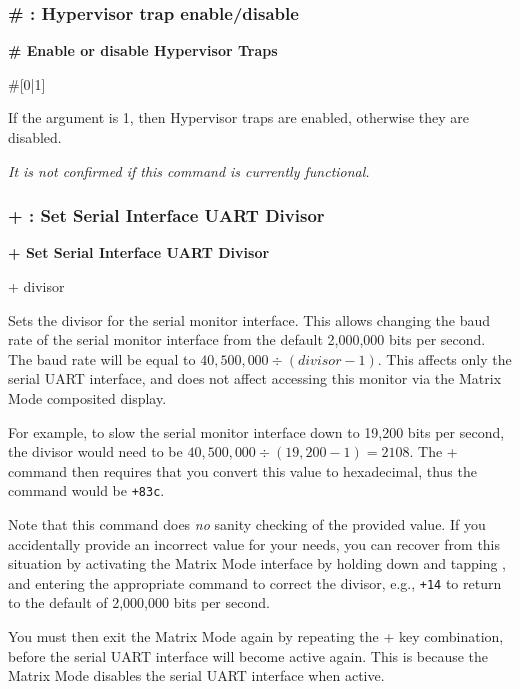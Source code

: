 \subsubsection{\# : Hypervisor trap enable/disable}

\begin{description}[leftmargin=2cm,style=nextline]
\item [Format:] {\bf \# Enable or disable Hypervisor Traps}
\item [Usage:] \#[0|1]

\item [Remarks:] If the argument is 1, then Hypervisor traps are enabled,
  otherwise they are disabled.

  {\em It is not confirmed if this command is currently functional.}
\end{description}


\subsubsection{+ : Set Serial Interface UART Divisor}

\begin{description}[leftmargin=2cm,style=nextline]
\item [Format:] {\bf + Set Serial Interface UART Divisor}
\item [Usage:] + divisor

\item [Remarks:] Sets the divisor for the serial monitor interface.
  This allows changing the baud rate of the serial monitor interface
  from the default 2,000,000 bits per second.  The baud rate will be
  equal to $40,500,000 \div (divisor-1)$. This affects only the
  serial UART interface, and does not affect accessing this monitor
  via the Matrix Mode composited display.

  For example, to slow the
  serial monitor interface down to 19,200 bits per second, the divisor
  would need to be $40,500,000 \div (19,200 - 1) = 2108$.
  The + command then requires that you convert this value to hexadecimal,
  thus the command would be {\tt +83c}.

  Note that this command does {\em no} sanity checking of the provided value.
  If you accidentally provide an incorrect value for your needs, you can
  recover from this situation by activating the Matrix Mode interface by holding
  down \megasymbolkey and tapping , and entering
  the appropriate command to correct the divisor, e.g., {\tt +14} to return
  to the default of 2,000,000 bits per second.

  You must then exit the Matrix
  Mode again by repeating the \megasymbolkey +  key combination,
  before the serial UART interface will become active again. This is because
  the Matrix Mode disables the serial UART interface when active.
\end{description}

